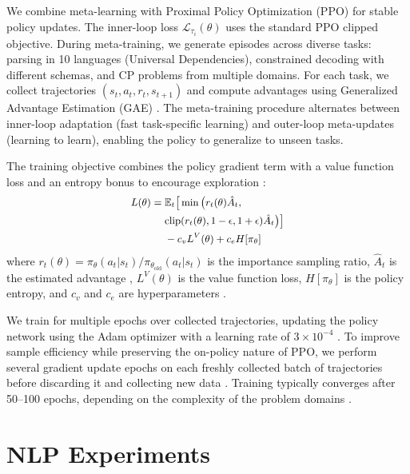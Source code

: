 \documentclass[11pt]{article}
\begin{document}
We combine meta-learning with Proximal Policy Optimization (PPO) \citep{schulman2017proximal} for stable policy updates. The inner-loop loss $\mathcal{L}_{\tau_i}(\theta)$ uses the standard PPO clipped objective. During meta-training, we generate episodes across diverse tasks: parsing in 10 languages (Universal Dependencies), constrained decoding with different schemas, and CP problems from multiple domains. For each task, we collect trajectories $(s_t, a_t, r_t, s_{t+1})$ and compute advantages using Generalized Advantage Estimation (GAE) \citep{schulman2017proximal}. The meta-training procedure alternates between inner-loop adaptation (fast task-specific learning) and outer-loop meta-updates (learning to learn), enabling the policy to generalize to unseen tasks.

The training objective combines the policy gradient term with a value function loss and an entropy bonus to encourage exploration \citep{schulman2017proximal}:
\begin{equation}
\small
\begin{aligned}
L(\theta) =\; & \mathbb{E}_t\big[\min\big(r_t(\theta)\hat{A}_t, \\
& \text{clip}(r_t(\theta), 1-\epsilon, 1+\epsilon)\hat{A}_t\big)\big] \\
& {} - c_v L^V(\theta) + c_e H[\pi_\theta]
\end{aligned}
\end{equation}
where $r_t(\theta) = \pi_\theta(a_t|s_t) / \pi_{\theta_{\text{old}}}(a_t|s_t)$ is the importance sampling ratio, $\hat{A}_t$ is the estimated advantage \citep{sutton2018reinforcement}, $L^V(\theta)$ is the value function loss, $H[\pi_\theta]$ is the policy entropy, and $c_v$ and $c_e$ are hyperparameters \citep{schulman2017proximal}.

We train for multiple epochs over collected trajectories, updating the policy network using the Adam optimizer \citep{kingma2014adam} with a learning rate of $3 \times 10^{-4}$ \citep{lecun2015deep}. To improve sample efficiency while preserving the on-policy nature of PPO, we perform several gradient update epochs on each freshly collected batch of trajectories before discarding it and collecting new data \citep{mnih2015human}. Training typically converges after 50--100 epochs, depending on the complexity of the problem domains \citep{goodfellow2016deep}.

\section{NLP Experiments}
\label{sec:nlp-experiments}
\end{document}
